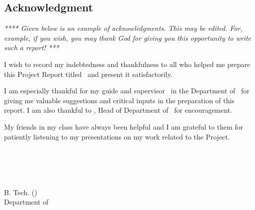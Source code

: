 \newpage
{}
\thispagestyle{empty}
\begin{spacing}{1.5}
%
\chapter*{Acknowledgment}
\textit { **** Given below is an example of acknowledgments. This may be edited. For, example, if you wish, you may thank God for giving you this opportunity to write such a report! *** } 


I wish to record my indebtedness and thankfulness 
to all who helped me prepare this Project Report titled 
{\bfseries \vtitle}\  and present it satisfactorily. 

I am especially thankful for my 
guide and supervisor \vguide\  in the Department of \vdept\  
for giving me valuable suggestions and 
critical inputs in the preparation of this report. 
I am also thankful to \vhod, Head of Department of  \vdept\  
for encouragement. 

My friends in my class have always been 
helpful and I am grateful to them for 
patiently listening to my presentations on my work related to the Project. 


\begin{flushright}
\vname\\

\vnamei\\

\vnameii\\

\vnameiii\\

B. Tech. (\vspecialization)\\
Department of \vdept\\
\vcollege\ 
\end{flushright}



\end{spacing}  